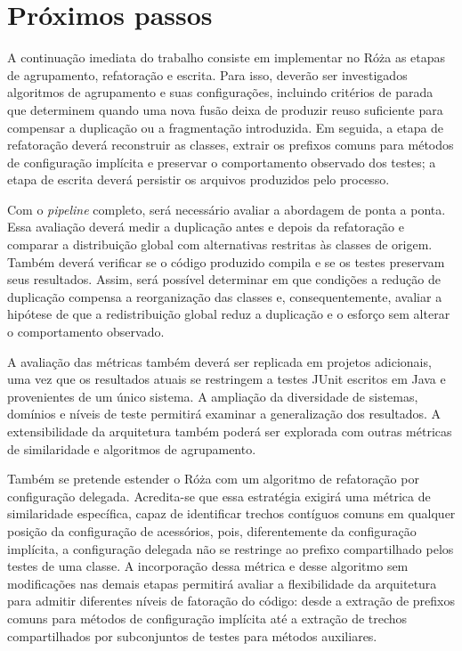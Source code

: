 \section{Próximos passos}

A continuação imediata do trabalho consiste em implementar no Róża as etapas de agrupamento, refatoração e escrita. Para isso, deverão ser investigados algoritmos de agrupamento e suas configurações, incluindo critérios de parada que determinem quando uma nova fusão deixa de produzir reuso suficiente para compensar a duplicação ou a fragmentação introduzida. Em seguida, a etapa de refatoração deverá reconstruir as classes, extrair os prefixos comuns para métodos de configuração implícita e preservar o comportamento observado dos testes; a etapa de escrita deverá persistir os arquivos produzidos pelo processo.

Com o \textit{pipeline} completo, será necessário avaliar a abordagem de ponta a ponta. Essa avaliação deverá medir a duplicação antes e depois da refatoração e comparar a distribuição global com alternativas restritas às classes de origem. Também deverá verificar se o código produzido compila e se os testes preservam seus resultados. Assim, será possível determinar em que condições a redução de duplicação compensa a reorganização das classes e, consequentemente, avaliar a hipótese de que a redistribuição global reduz a duplicação e o esforço sem alterar o comportamento observado.

A avaliação das métricas também deverá ser replicada em projetos adicionais, uma vez que os resultados atuais se restringem a testes JUnit escritos em Java e provenientes de um único sistema. A ampliação da diversidade de sistemas, domínios e níveis de teste permitirá examinar a generalização dos resultados. A extensibilidade da arquitetura também poderá ser explorada com outras métricas de similaridade e algoritmos de agrupamento.

Também se pretende estender o Róża com um algoritmo de refatoração por configuração delegada. Acredita-se que essa estratégia exigirá uma métrica de similaridade específica, capaz de identificar trechos contíguos comuns em qualquer posição da configuração de acessórios, pois, diferentemente da configuração implícita, a configuração delegada não se restringe ao prefixo compartilhado pelos testes de uma classe. A incorporação dessa métrica e desse algoritmo sem modificações nas demais etapas permitirá avaliar a flexibilidade da arquitetura para admitir diferentes níveis de fatoração do código: desde a extração de prefixos comuns para métodos de configuração implícita até a extração de trechos compartilhados por subconjuntos de testes para métodos auxiliares.